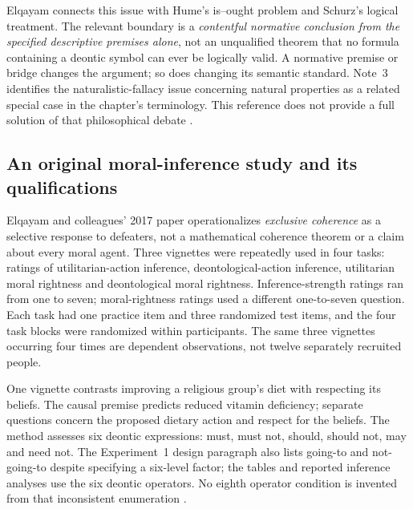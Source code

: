 Elqayam connects this issue with Hume's is--ought problem and Schurz's logical
treatment. The relevant boundary is a \emph{contentful normative conclusion
from the specified descriptive premises alone}, not an unqualified theorem
that no formula containing a deontic symbol can ever be logically valid.
A normative premise or bridge changes the argument; so does changing its
semantic standard. Note~3 identifies the naturalistic-fallacy issue concerning
natural properties as a related special case in the chapter's terminology.
This reference does not provide a full solution of that philosophical debate
\cite[pp.~654--655, note~3]{Elqayam2021DeonticPsychology}.

\subsection{An original moral-inference study and its qualifications}
\label{sec:p19-r112-moral-record}

Elqayam and colleagues' 2017 paper operationalizes \emph{exclusive coherence}
as a selective response to defeaters, not a mathematical coherence theorem
or a claim about every moral agent. Three vignettes were repeatedly used
in four tasks: ratings of utilitarian-action inference, deontological-action
inference, utilitarian moral rightness and deontological moral rightness.
Inference-strength ratings ran from one to seven; moral-rightness ratings
used a different one-to-seven question. Each task had one practice item and
three randomized test items, and the four task blocks were randomized
within participants. The same three vignettes occurring four times are
dependent observations, not twelve separately recruited people.

One vignette contrasts improving a religious group's diet with respecting
its beliefs. The causal premise predicts reduced vitamin deficiency; separate
questions concern the proposed dietary action and respect for the beliefs.
The method assesses six deontic expressions: must, must not, should, should
not, may and need not. The Experiment~1 design paragraph also lists going-to
and not-going-to despite specifying a six-level factor; the tables and
reported inference analyses use the six deontic operators. No eighth
operator condition is invented from that inconsistent enumeration
\cite[pp.~5--10, table~1]{ElqayamEtAl2017MoralInference}.

